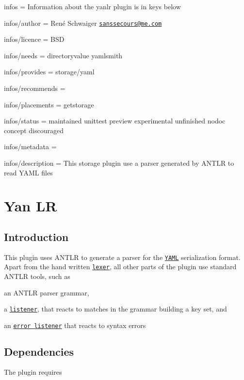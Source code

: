 
\begin{DoxyItemize}
\item infos = Information about the yanlr plugin is in keys below
\item infos/author = René Schwaiger \href{mailto:sanssecours@me.com}{\tt sanssecours@me.\+com}
\item infos/licence = B\+SD
\item infos/needs = directoryvalue yamlsmith
\item infos/provides = storage/yaml
\item infos/recommends =
\item infos/placements = getstorage
\item infos/status = maintained unittest preview experimental unfinished nodoc concept discouraged
\item infos/metadata =
\item infos/description = This storage plugin use a parser generated by A\+N\+T\+LR to read Y\+A\+ML files
\end{DoxyItemize}\hypertarget{autotoc_md955_src_plugins_yanlr_README_md}{}\section{Yan LR}\label{autotoc_md955_src_plugins_yanlr_README_md}
\hypertarget{autotoc_md955_autotoc_md956}{}\subsection{Introduction}\label{autotoc_md955_autotoc_md956}
This plugin uses A\+N\+T\+LR to generate a parser for the \href{http://yaml.org}{\tt Y\+A\+ML} serialization format. Apart from the hand written \href{/home/jenkins/workspace/libelektra-release/src/plugins/yanlr/yaml_lexer.cpp}{\tt lexer}, all other parts of the plugin use standard A\+N\+T\+LR tools, such as


\begin{DoxyItemize}
\item an A\+N\+T\+LR parser grammar,
\item a \href{/home/jenkins/workspace/libelektra-release/src/plugins/yanlr/listener.cpp}{\tt listener}, that reacts to matches in the grammar building a key set, and
\item an \href{/home/jenkins/workspace/libelektra-release/src/plugins/yanlr/error_listener.cpp}{\tt error listener} that reacts to syntax errors
\end{DoxyItemize}\hypertarget{autotoc_md955_autotoc_md957}{}\subsection{Dependencies}\label{autotoc_md955_autotoc_md957}
The plugin requires


